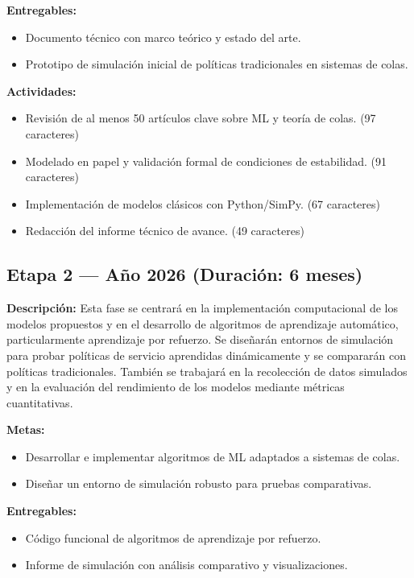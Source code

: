 \documentclass[12pt]{article}
\begin{document}
\textbf{Entregables:}
\begin{itemize}
  \item Documento técnico con marco teórico y estado del arte.
  \item Prototipo de simulación inicial de políticas tradicionales en sistemas de colas.
\end{itemize}

\textbf{Actividades:}
\begin{itemize}
  \item Revisión de al menos 50 artículos clave sobre ML y teoría de colas. (97 caracteres)
  \item Modelado en papel y validación formal de condiciones de estabilidad. (91 caracteres)
  \item Implementación de modelos clásicos con Python/SimPy. (67 caracteres)
  \item Redacción del informe técnico de avance. (49 caracteres)
\end{itemize}

\subsection*{Etapa 2 — Año 2026 (Duración: 6 meses)}
\textbf{Descripción:} Esta fase se centrará en la implementación computacional de los modelos propuestos y en el desarrollo de algoritmos de aprendizaje automático, particularmente aprendizaje por refuerzo. Se diseñarán entornos de simulación para probar políticas de servicio aprendidas dinámicamente y se compararán con políticas tradicionales. También se trabajará en la recolección de datos simulados y en la evaluación del rendimiento de los modelos mediante métricas cuantitativas.

\textbf{Metas:}
\begin{itemize}
  \item Desarrollar e implementar algoritmos de ML adaptados a sistemas de colas.
  \item Diseñar un entorno de simulación robusto para pruebas comparativas.
\end{itemize}

\textbf{Entregables:}
\begin{itemize}
  \item Código funcional de algoritmos de aprendizaje por refuerzo.
  \item Informe de simulación con análisis comparativo y visualizaciones.
\end{itemize}
\end{document}
